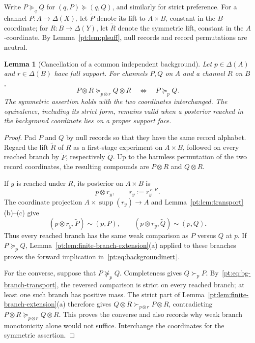 \documentclass[11pt,a4paper]{article}
\newtheorem{lemma}[theorem]{Lemma}
\theoremstyle{definition}
\newcommand{\1}{\mathbf 1}
\begin{document}
Write $P\succeq_qQ$ for $(q,P)\succeq(q,Q)$, and similarly for strict
preference.  For a channel $P:A\to\Delta(X)$, let $\widetilde P$ denote its
lift to $A\times B$, constant in the $B$-coordinate; for
$R:B\to\Delta(Y)$, let $\widetilde R$ denote the symmetric lift, constant in
the $A$-coordinate.
By Lemma~\ref{pt:lem:plsuff}, null records and record permutations are neutral.

\begin{lemma}[Cancellation of a common independent background]
\label{pt:lem:background}
Let $p\in\Delta(A)$ and $r\in\Delta(B)$ have full support.  For channels
$P,Q$ on $A$ and a channel $R$ on $B$,
\begin{equation}
 P\otimes R\succeq_{p\otimes r}Q\otimes R
 \quad\Longleftrightarrow\quad
 P\succeq_p Q.
\tag{BI}\label{pt:eq:backgroundinert}
\end{equation}
The symmetric assertion holds with the two coordinates interchanged.  The
equivalence, including its strict form, remains valid when a posterior reached
in the background coordinate lies on a proper support face.
\end{lemma}

\begin{proof}
Pad $P$ and $Q$ by null records so that they have the same record alphabet.
Regard the lift $\widetilde R$ of $R$ as a first-stage experiment on
$A\times B$, followed on every reached branch by $\widetilde P$, respectively
$\widetilde Q$.  Up to the harmless permutation of the two record
coordinates, the resulting compounds are $P\otimes R$ and $Q\otimes R$.

If $y$ is reached under $R$, its posterior on $A\times B$ is
\[
 p\otimes r_y,
 \qquad r_y:=r_y^{\,r,R}.
\]
The coordinate projection $A\times\operatorname{supp}(r_y)\to A$ and
Lemma~\ref{pt:lem:transport}\textup{(b)--(c)} give
\[
 (p\otimes r_y,\widetilde P)\sim(p,P),
 \qquad
 (p\otimes r_y,\widetilde Q)\sim(p,Q).
\tag{BI$'$}\label{pt:eq:bg-branch-transport}
\]
Thus every reached branch has the same weak comparison as $P$ versus $Q$ at
$p$.  If $P\succeq_pQ$, Lemma~\ref{pt:lem:finite-branch-extension}\textup{(a)} applied to
these branches proves the forward implication in~\eqref{pt:eq:backgroundinert}.

For the converse, suppose that $P\not\succeq_pQ$.  Completeness gives
$Q\succ_pP$.  By~\eqref{pt:eq:bg-branch-transport}, the reversed comparison is
strict on every reached branch; at least one such branch has positive mass.
The strict part of Lemma~\ref{pt:lem:finite-branch-extension}\textup{(a)} therefore gives
$Q\otimes R\succ_{p\otimes r}P\otimes R$, contradicting
$P\otimes R\succeq_{p\otimes r}Q\otimes R$.  This proves the converse and
also records why weak branch monotonicity alone would not suffice.  Interchange
the coordinates for the symmetric assertion.
\end{proof}
\end{document}
